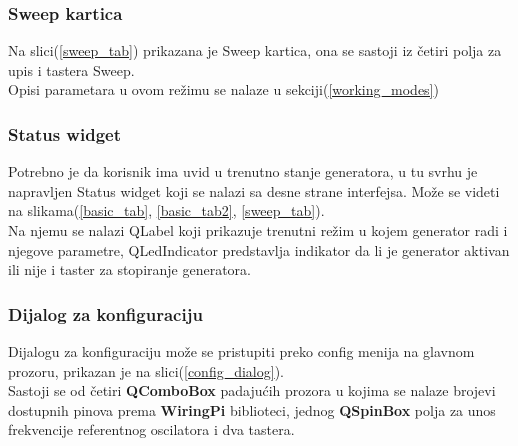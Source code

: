 \subsubsection{Sweep kartica}

Na slici(\ref{sweep_tab}) prikazana je Sweep kartica, ona se sastoji iz četiri
polja za upis i tastera Sweep. \\
Opisi parametara u ovom režimu se nalaze u sekciji(\ref{working_modes})

\begin{figure}[H]
\end{figure}

\subsubsection{Status widget}

Potrebno je da korisnik ima uvid u trenutno stanje generatora, u tu svrhu je
napravljen Status widget koji se nalazi sa desne strane interfejsa.
Može se videti na slikama(\ref{basic_tab}, \ref{basic_tab2}, \ref{sweep_tab}).
\\
Na njemu se nalazi QLabel\cite{QLabel} koji prikazuje trenutni režim u kojem
generator radi i njegove parametre, QLedIndicator\cite{QLedIndicator}
predstavlja indikator da li je generator aktivan ili nije i taster za stopiranje generatora.


\subsubsection{Dijalog za konfiguraciju}

Dijalogu za konfiguraciju može se pristupiti preko config menija na glavnom
prozoru, prikazan je na slici(\ref{config_dialog}). \\
Sastoji se od četiri \textbf{QComboBox}\cite{QComboBox} padajućih prozora u
kojima se nalaze brojevi dostupnih pinova prema \textbf{WiringPi} biblioteci, jednog
\textbf{QSpinBox} polja za unos frekvencije referentnog oscilatora i dva tastera. \\

